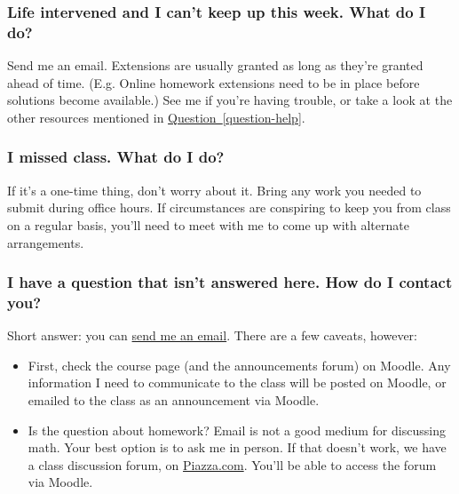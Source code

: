 \documentclass[10pt,]{article}
\begin{document}
\subsubsection[{Life intervened and I can't keep up this week. What do I do?}]{Life intervened and I can't keep up this week. What do I do?}\label{subsubsection-31}
\hypertarget{p-42}{}%
Send me an email. Extensions are usually granted as long as they're granted ahead of time. (E.g. Online homework extensions need to be in place before solutions become available.) See me if you're having trouble, or take a look at the other resources mentioned in \hyperref[question-help]{Question~\ref{question-help}}.%
%
%
\typeout{************************************************}
\typeout{************************************************}
%
\subsubsection[{I missed class. What do I do?}]{I missed class. What do I do?}\label{subsubsection-32}
\hypertarget{p-43}{}%
If it's a one-time thing, don't worry about it. Bring any work you needed to submit during office hours. If circumstances are conspiring to keep you from class on a regular basis, you'll need to meet with me to come up with alternate arrangements.%
%
%
\typeout{************************************************}
\typeout{************************************************}
%
\subsubsection[{I have a question that isn't answered here. How do I contact you?}]{I have a question that isn't answered here. How do I contact you?}\label{section-communication}
\hypertarget{p-44}{}%
Short answer: you can \href{mailto:sean.fitzpatrick@uleth.ca}{send me an email}. There are a few caveats, however:%
\leavevmode%
\begin{itemize}[label=\textbullet]
\item{}First, check the course page (and the announcements forum) on Moodle. Any information I need to communicate to the class will be posted on Moodle, or emailed to the class as an announcement via Moodle.%
\item{}Is the question about homework? Email is not a good medium for discussing math. Your best option is to ask me in person. If that doesn't work, we have a class discussion forum, on \href{https://piazza.com}{Piazza.com}. You'll be able to access the forum via Moodle.%
\end{itemize}
%
%
\typeout{************************************************}
\typeout{************************************************}
%
\end{document}
